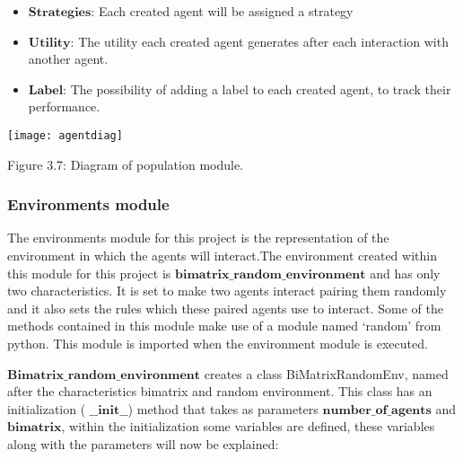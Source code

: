 \documentclass{article}
\begin{document}
\begin{itemize}
	\item $\textbf{Strategies:}$ Each created agent will be assigned a strategy
	\item $\textbf{Utility:}$ The utility each created agent generates after each interaction with another agent.
	\item $\textbf{Label:}$ The possibility of adding a label to each created agent, to track their performance.
\end{itemize}

\begin{center}
	\texttt{[image: agentdiag]}

Figure 3.7: Diagram of population module.
\end{center}

\subsubsection{Environments module}
The environments module for this project is the representation of the environment in which the agents will interact.The environment created within this module for this project is $\textbf{bimatrix\_random\_environment}$ and has only two characteristics. It is set to make two agents interact pairing them randomly and it also sets the rules which these paired agents use to interact. Some of the methods contained in this module make use of a module named ‘random’ from python. This module is imported when the environment module is executed. 

$\textbf{Bimatrix\_random\_environment}$ creates a class BiMatrixRandomEnv, named after the characteristics bimatrix and random environment. This class has an initialization ( $\textbf{\_\_init\_\_}$) method that takes as parameters $\textbf{number\_of\_agents}$ and $\textbf{bimatrix}$, within the initialization some variables are defined, these variables along with the parameters will now be explained:
\end{document}

